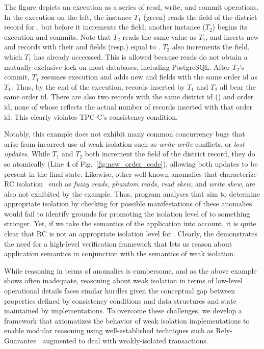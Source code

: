 The figure depicts an execution as a series of read, write, and commit
operations. In the execution on the left, the  instance
$T_1$ (green) reads the  field of the district
record for , but before it increments the field, another
 instance ($T_2$) begins its execution and commits. Note
that $T_2$ reads the same  value as $T_1$, and
inserts new  and  records with their 
and  fields (resp.) equal to . $T_2$
also increments the  field, which $T_1$ has already
acccessed. This is allowed because reads do not obtain a mutually
exclusive lock on most databases, including PostgreSQL. After $T_2$'s
commit, $T_1$ resumes execution and adds new  and
 fields with the same order id as $T_1$. Thus, by the
end of the execution,  records inserted by $T_1$ and
$T_2$ all bear the same order id. There are also two  records
with the same district id () and order id, none of whose
 reflects the actual number of  records
inserted with that order id.  This clearly violates TPC-C's consistency
condition.

Notably, this example does not exhibit many common concurrency bugs
that arise from incorrect use of weak isolation such as
\emph{write-write} conflicts, or \emph{lost updates}.  While $T_1$ and
$T_2$ both increment the  field of the district
record, they do so atomically (Line 4 of
Fig.~\ref{fig:new_order_code}), allowing both updates to be present in
the final state. Likewise, other well-known anomalies that
characterize RC isolation~\cite{berenson} such as \emph{fuzzy reads},
\emph{phantom reads}, \emph{read skew}, and \emph{write skew}, are
also not exhibited by the example.  Thus, program analyses that aim to
determine appropriate isolation by checking for possible
manifestations of these anomalies would fail to identify grounds for
promoting the isolation level of  to something stronger.
Yet, if we take the semantics of the application into account, it is
quite clear that RC is not an appropriate isolation level for
. Clearly, the demonstrates the need for a high-level
verification framework that lets us reason about application semantics
in conjunction with the semantics of weak isolation.

While reasoning in terms of anomalies is cumbersome, and as the above
example shows often inadequate, reasoning about weak isolation in
terms of low-level operational details faces similar hurdles given the
conceptual gap between properties defined by consistency conditions
and data structures and state maintained by implementations.  To
overcome these challenges, we develop a framework that axiomatizes the
behavior of weak isolation implementations to enable modular reasoning
using well-established techniques such as Rely-Guarantee~\cite{...}
augmented to deal with weakly-isolated transactions.


